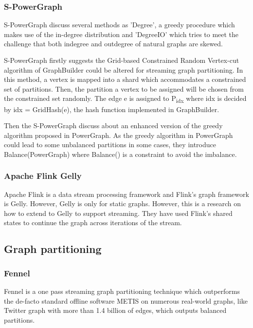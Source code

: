 \documentclass[12pt]{article}
\begin{document}
\subsubsection{S-PowerGraph}

S-PowerGraph\cite{S-PowerGraph} discuss several methods as 'Degree', a greedy procedure which makes use of the in-degree distribution and 'DegreeIO' which tries to meet the challenge that both indegree and outdegree of natural graphs are skewed.

S-PowerGraph firstly suggests the Grid-based Constrained Random Vertex-cut algorithm of GraphBuilder\cite{Graphbuilder}  could be altered for streaming graph partitioning. In this method, a vertex is mapped into a shard which accommodates a constrained set of partitions. Then, the partition a vertex to be assigned will be chosen from the constrained set randomly. The edge e is assigned to P\textsubscript{idx} where idx is decided by idx = GridHash(e), the hash function implemented in GraphBuilder.

Then the S-PowerGraph discuss about an enhanced version of the greedy algorithm proposed in PowerGraph\cite{PowerGraph}. As the greedy algorithm in PowerGraph could lead to some unbalanced partitions in some cases, they introduce Balance(PowerGraph) where Balance() is a constraint to avoid the imbalance. 

\subsubsection{Apache Flink Gelly}
Apache Flink is a data stream processing framework and Flink's graph framework is Gelly. However, Gelly is only for static graphs. However, this \cite{Kalavri} is a research on how to extend to Gelly to support streaming. They have used Flink's shared states to continue the graph across iterations of the stream. 

\subsection{Graph partitioning}
\subsubsection{Fennel}

Fennel \cite{Fennel} is a one pass streaming graph partitioning technique which outperforms the de-facto standard offline software METIS on numerous real-world graphs, like Twitter graph with more than 1.4 billion of edges, which outputs balanced partitions.
\end{document}
